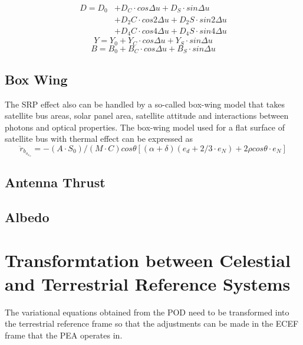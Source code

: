 \begin{equation}
\begin{split}
D = D_0 &+ D_C  \cdot cos  \Delta u + D_S  \cdot sin  \Delta u \\
        &+ D_2C \cdot cos 2\Delta u + D_2S \cdot sin 2\Delta u \\
        &+ D_4C \cdot cos 4\Delta u + D_4S \cdot sin 4\Delta u 
\end{split}
\end{equation}
\begin{equation}
Y = Y_0 + Y_C \cdot cos \Delta u + Y_S \cdot sin \Delta u
\end{equation}
\begin{equation}
B = B_0 + B_C \cdot cos \Delta u + B_S \cdot sin \Delta u
\end{equation}


\subsection{Box Wing}
The SRP effect also can be handled by a so-called box-wing model that takes satellite bus areas, solar panel area, satellite attitude and interactions between photons and optical properties. The box-wing model used for a flat surface of satellite bus with thermal effect can be expressed as
\begin{equation}
\ddot{r}_b_o_x_w = -(A \cdot S_0)/(M \cdot C) cos \theta  
                   [(\alpha + \delta)(e_d+2/3 \cdot e_N) + 2\rho cos \theta \cdot e_N]  
\end{equation}


\subsection{Antenna Thrust}

\subsection{Albedo}

\section{Transformtation between Celestial and Terrestrial Reference Systems}

The variational equations obtained from the POD need to be transformed into the terrestrial reference frame so that the adjustments can be made in the ECEF frame that the PEA operates in.

